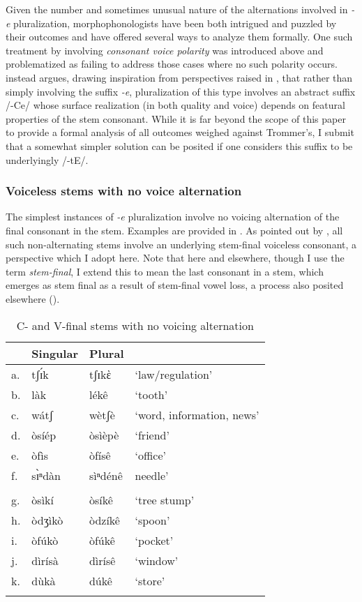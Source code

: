 \documentclass[output=paper,colorlinks,citecolor=brown]{langscibook}
\begin{document}
Given the number and sometimes unusual nature of the alternations involved in \textit{-e} pluralization, morphophonologists have been both intrigued and puzzled by their outcomes and have offered several ways to analyze them formally. One such treatment by \citet{Alderete1999} involving \textit{consonant voice polarity} was  introduced above and problematized as failing to address those cases where no such polarity occurs. \citet[245]{Trommer2011} instead argues, drawing inspiration from perspectives raised in \citet{Tucker1994}, that rather than simply involving the suffix \textit{-e}, pluralization of this type involves an abstract suffix /-Ce/ whose surface realization (in both quality and voice) depends on featural properties  of the stem consonant. While it is far beyond the scope of this paper to provide a formal analysis of all outcomes weighed against Trommer's, I submit that a somewhat simpler solution can be posited if one considers this suffix to be underlyingly /-tE/.

\subsubsection{Voiceless stems with no voice alternation}\largerpage

The simplest instances of \textit{-e} pluralization involve no voicing alternation of the final consonant in the stem. Examples are provided in . As pointed out by \citet{Tucker1994}, all such non-alternating stems involve an underlying stem-final voiceless consonant, a perspective which I adopt here. Note that here and elsewhere, though I use the term \textit{stem-final}, I extend this to mean the last consonant in a stem, which emerges as stem final as a result of stem-final vowel loss, a process also posited elsewhere (\citealt{Trommer2011, Tucker1994}). 

\begin{table}
\caption{C- and V-final stems with no voicing alternation}
\label{tab:NoAlternation}
 \begin{tabular}{llll}
  \lsptoprule
& Singular & Plural &  \\
\midrule
a.&	tʃɪ́k&	tʃɪkὲ&	`law/regulation'\\
b. & làk & lékê & `tooth' \\
c. & wátʃ & wètʃè & `word, information, news' \\
d.&	òsíép&	òsìèpè	&`friend'\\
e. &òfìs &òfísê & `office' \\  
f. &sɪ̀ⁿdàn & sìⁿdénê &needle'  \\
&&& \\ 
g.	&òsìkí	&òsíkê	&`tree stump'\\
h. &òdʒìkò &òdzíkê    &`spoon' \\
i.& òfúkò &òfúkê &`pocket' \\
j. & dìrísà &dìrísê &`window' \\
k.& dùkà & dúkê & `store' \\
  \lspbottomrule
 \end{tabular}
\end{table}   
\end{document}
